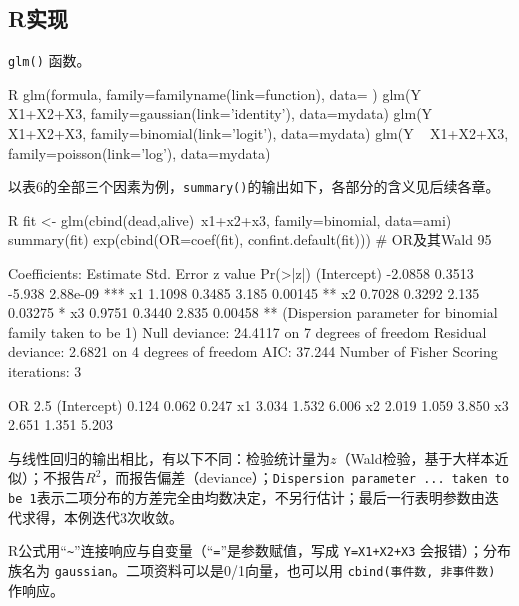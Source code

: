 \subsection{R实现}
\texttt{glm()} 函数。
\par\noindent
\begin{coursecode}{R}
glm(formula, family=familyname(link=function), data= )
glm(Y ~ X1+X2+X3, family=gaussian(link='identity'), data=mydata)
glm(Y ~ X1+X2+X3, family=binomial(link='logit'), data=mydata)
glm(Y ~ X1+X2+X3, family=poisson(link='log'), data=mydata)
\end{coursecode}
\par
以表6的全部三个因素为例，\texttt{summary()}的输出如下，各部分的含义见后续各章。
\par\noindent
\begin{coursecode}{R}
fit <- glm(cbind(dead,alive)~x1+x2+x3, family=binomial, data=ami)
summary(fit)
exp(cbind(OR=coef(fit), confint.default(fit)))   # OR及其Wald 95%
\end{coursecode}
\begin{routput}
Coefficients:
            Estimate Std. Error z value Pr(>|z|)    
(Intercept)  -2.0858     0.3513  -5.938 2.88e-09 ***
x1            1.1098     0.3485   3.185  0.00145 ** 
x2            0.7028     0.3292   2.135  0.03275 *  
x3            0.9751     0.3440   2.835  0.00458 ** 
(Dispersion parameter for binomial family taken to be 1)
    Null deviance: 24.4117  on 7  degrees of freedom
Residual deviance:  2.6821  on 4  degrees of freedom
AIC: 37.244
Number of Fisher Scoring iterations: 3

               OR 2.5 %
(Intercept) 0.124 0.062  0.247
x1          3.034 1.532  6.006
x2          2.019 1.059  3.850
x3          2.651 1.351  5.203
\end{routput}
与线性回归的输出相比，有以下不同：检验统计量为$z$（Wald检验，基于大样本近似）；不报告$R^2$，而报告偏差（deviance）；\texttt{Dispersion parameter ... taken to be 1}表示二项分布的方差完全由均数决定，不另行估计；最后一行表明参数由迭代求得，本例迭代3次收敛。

R公式用“\texttt{\textasciitilde}”连接响应与自变量（“\texttt{=}”是参数赋值，写成 \texttt{Y=X1+X2+X3} 会报错）；分布族名为 \texttt{gaussian}。二项资料可以是0/1向量，也可以用 \texttt{cbind(事件数, 非事件数)} 作响应。
